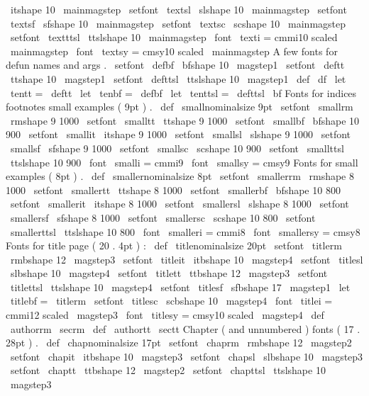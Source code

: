 \
itshape
{
10
}
{
\
mainmagstep
}
\
setfont
\
textsl
\
slshape
{
10
}
{
\
mainmagstep
}
\
setfont
\
textsf
\
sfshape
{
10
}
{
\
mainmagstep
}
\
setfont
\
textsc
\
scshape
{
10
}
{
\
mainmagstep
}
\
setfont
\
textttsl
\
ttslshape
{
10
}
{
\
mainmagstep
}
\
font
\
texti
=
cmmi10
scaled
\
mainmagstep
\
font
\
textsy
=
cmsy10
scaled
\
mainmagstep
%
A
few
fonts
for
defun
names
and
args
.
\
setfont
\
defbf
\
bfshape
{
10
}
{
\
magstep1
}
\
setfont
\
deftt
\
ttshape
{
10
}
{
\
magstep1
}
\
setfont
\
defttsl
\
ttslshape
{
10
}
{
\
magstep1
}
\
def
\
df
{
\
let
\
tentt
=
\
deftt
\
let
\
tenbf
=
\
defbf
\
let
\
tenttsl
=
\
defttsl
\
bf
}
%
Fonts
for
indices
footnotes
small
examples
(
9pt
)
.
\
def
\
smallnominalsize
{
9pt
}
\
setfont
\
smallrm
\
rmshape
{
9
}
{
1000
}
\
setfont
\
smalltt
\
ttshape
{
9
}
{
1000
}
\
setfont
\
smallbf
\
bfshape
{
10
}
{
900
}
\
setfont
\
smallit
\
itshape
{
9
}
{
1000
}
\
setfont
\
smallsl
\
slshape
{
9
}
{
1000
}
\
setfont
\
smallsf
\
sfshape
{
9
}
{
1000
}
\
setfont
\
smallsc
\
scshape
{
10
}
{
900
}
\
setfont
\
smallttsl
\
ttslshape
{
10
}
{
900
}
\
font
\
smalli
=
cmmi9
\
font
\
smallsy
=
cmsy9
%
Fonts
for
small
examples
(
8pt
)
.
\
def
\
smallernominalsize
{
8pt
}
\
setfont
\
smallerrm
\
rmshape
{
8
}
{
1000
}
\
setfont
\
smallertt
\
ttshape
{
8
}
{
1000
}
\
setfont
\
smallerbf
\
bfshape
{
10
}
{
800
}
\
setfont
\
smallerit
\
itshape
{
8
}
{
1000
}
\
setfont
\
smallersl
\
slshape
{
8
}
{
1000
}
\
setfont
\
smallersf
\
sfshape
{
8
}
{
1000
}
\
setfont
\
smallersc
\
scshape
{
10
}
{
800
}
\
setfont
\
smallerttsl
\
ttslshape
{
10
}
{
800
}
\
font
\
smalleri
=
cmmi8
\
font
\
smallersy
=
cmsy8
%
Fonts
for
title
page
(
20
.
4pt
)
:
\
def
\
titlenominalsize
{
20pt
}
\
setfont
\
titlerm
\
rmbshape
{
12
}
{
\
magstep3
}
\
setfont
\
titleit
\
itbshape
{
10
}
{
\
magstep4
}
\
setfont
\
titlesl
\
slbshape
{
10
}
{
\
magstep4
}
\
setfont
\
titlett
\
ttbshape
{
12
}
{
\
magstep3
}
\
setfont
\
titlettsl
\
ttslshape
{
10
}
{
\
magstep4
}
\
setfont
\
titlesf
\
sfbshape
{
17
}
{
\
magstep1
}
\
let
\
titlebf
=
\
titlerm
\
setfont
\
titlesc
\
scbshape
{
10
}
{
\
magstep4
}
\
font
\
titlei
=
cmmi12
scaled
\
magstep3
\
font
\
titlesy
=
cmsy10
scaled
\
magstep4
\
def
\
authorrm
{
\
secrm
}
\
def
\
authortt
{
\
sectt
}
%
Chapter
(
and
unnumbered
)
fonts
(
17
.
28pt
)
.
\
def
\
chapnominalsize
{
17pt
}
\
setfont
\
chaprm
\
rmbshape
{
12
}
{
\
magstep2
}
\
setfont
\
chapit
\
itbshape
{
10
}
{
\
magstep3
}
\
setfont
\
chapsl
\
slbshape
{
10
}
{
\
magstep3
}
\
setfont
\
chaptt
\
ttbshape
{
12
}
{
\
magstep2
}
\
setfont
\
chapttsl
\
ttslshape
{
10
}
{
\
magstep3
}
